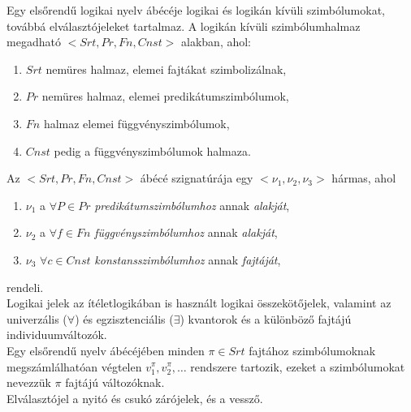 \documentclass[tikz,12pt,margin=0px]{article}
\begin{document}
	Egy elsőrendű logikai nyelv ábécéje logikai és logikán kívüli szimbólumokat, továbbá elválasztójeleket tartalmaz.
	A logikán kívüli szimbólumhalmaz megadható $<Srt, Pr, Fn, Cnst>$ alakban, ahol:
	
	\begin{enumerate}
		\item	$Srt$ nemüres halmaz, elemei fajtákat szimbolizálnak,
		\item	$Pr$ nemüres halmaz, elemei predikátumszimbólumok,
		\item	$Fn$ halmaz elemei függvényszimbólumok,
		\item	$Cnst$ pedig a függvényszimbólumok halmaza.
	\end{enumerate}

\newpage
	\noindent Az $<Srt, Pr, Fn, Cnst>$ ábécé szignatúrája egy $<\nu_{1}, \nu_{2}, \nu_{3}>$ hármas, ahol
	
	\begin{enumerate}
		\item $\nu_{1}$ a $\forall P \in Pr$ \emph{predikátumszimbólumhoz} annak \emph{alakját},\\
		\item $\nu_{2}$ a $\forall f \in Fn$ \emph{függvényszimbólumhoz} annak \emph{alakját}, \\
		\item $\nu_{3}$ $\forall c \in Cnst$ \emph{konstansszimbólumhoz} annak \emph{fajtáját}, \\
	\end{enumerate}
	\noindent rendeli.\\
	
    \noindent Logikai jelek az ítéletlogikában is használt logikai összekötőjelek, valamint az univerzális ($\forall$) és egzisztenciális ($\exists$) kvantorok és a különböző fajtájú individuumváltozók.\\

    \noindent Egy elsőrendű nyelv ábécéjében minden $\pi \in Srt$ fajtához szimbólumoknak megszámlálhatóan végtelen $v_{1}^{\pi}, v_{2}^{\pi}, \ldots$ rendszere tartozik, ezeket a szimbólumokat nevezzük $\pi$ fajtájú változóknak.\\
    Elválasztójel a nyitó és csukó zárójelek, és a vessző.\\
	
\end{document}
